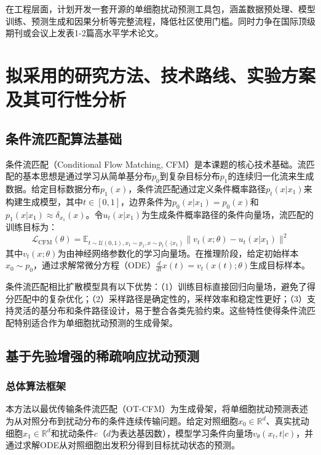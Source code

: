 在工程层面，计划开发一套开源的单细胞扰动预测工具包，涵盖数据预处理、模型训练、预测生成和因果分析等完整流程，降低社区使用门槛。同时力争在国际顶级期刊或会议上发表1-2篇高水平学术论文。

\clearpage
\section{拟采用的研究方法、技术路线、实验方案及其可行性分析}

\subsection{条件流匹配算法基础}

条件流匹配（Conditional Flow Matching, CFM）是本课题的核心技术基础。流匹配的基本思想是通过学习从简单基分布$p_0$到复杂目标分布$p_1$的连续归一化流来生成数据。给定目标数据分布$p_1(x)$，条件流匹配通过定义条件概率路径$p_t(x|x_1)$来构建生成模型，其中$t \in [0,1]$，边界条件为$p_0(x|x_1) = p_0(x)$和$p_1(x|x_1) \approx \delta_{x_1}(x)$。令$u_t(x|x_1)$为生成条件概率路径的条件向量场，流匹配的训练目标为：
\begin{equation}
\mathcal{L}_{\text{CFM}}(\theta) = \mathbb{E}_{t \sim \mathcal{U}(0,1), x_1 \sim p_1, x \sim p_t(\cdot|x_1)}\|v_t(x; \theta) - u_t(x|x_1)\|^2
\end{equation}
其中$v_t(x; \theta)$为由神经网络参数化的学习向量场。在推理阶段，给定初始样本$x_0 \sim p_0$，通过求解常微分方程（ODE）$\frac{d}{dt}x(t) = v_t(x(t); \theta)$生成目标样本。

条件流匹配相比扩散模型具有以下优势：（1）训练目标直接回归向量场，避免了得分匹配中的复杂优化；（2）采样路径是确定性的，采样效率和稳定性更好；（3）支持灵活的基分布和条件路径设计，易于整合各类先验约束。这些特性使得条件流匹配特别适合作为单细胞扰动预测的生成骨架。

\subsection{基于先验增强的稀疏响应扰动预测}

\subsubsection{总体算法框架}

本方法以最优传输条件流匹配（OT-CFM）为生成骨架，将单细胞扰动预测表述为从对照分布到扰动分布的条件连续传输问题。给定对照细胞$x_0\in\mathbb{R}^d$、真实扰动细胞$x_1\in\mathbb{R}^d$和扰动条件$c$（$d$为表达基因数），模型学习条件向量场$v_\theta(x_t,t|c)$，并通过求解ODE从对照细胞出发积分得到目标扰动状态的预测。

